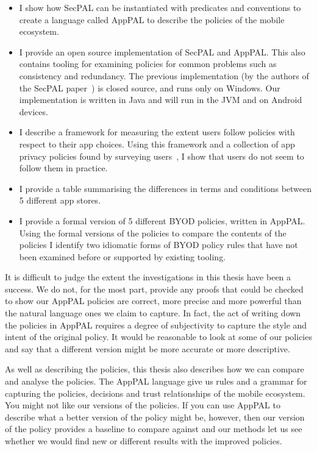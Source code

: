 \documentclass[thesis.tex]{subfiles}
\begin{document}
\begin{itemize}
  \item I show how SecPAL can be instantiated with predicates and conventions
    to create a language called AppPAL to describe the policies of the mobile
    ecosystem.
  \item I provide an open source implementation of SecPAL and AppPAL. This also
    contains tooling for examining policies for common problems such as
    consistency and redundancy.  The previous implementation (by the authors of
    the SecPAL paper~\cite{becker_secpal:_2006}) is closed source, and runs
    only on Windows.  Our implementation is written in Java and will run in the
    JVM and on Android devices.
  \item I describe a framework for measuring the extent users follow policies
    with respect to their app choices.  Using this framework and a collection
    of app privacy policies found by surveying users~\cite{lin_modeling_2014},
    I show that users do not seem to follow them in practice.
  \item I provide a table summarising the differences in terms and conditions
    between 5 different app stores.
  \item I provide a formal version of 5 different \ac{BYOD} policies, written in
    AppPAL.  Using the formal versions of the policies to compare the contents
    of the policies I identify two idiomatic forms of \ac{BYOD} policy rules that
    have not been examined before or supported by existing tooling.
\end{itemize}

It is difficult to judge the extent the investigations in this thesis have been
a success.  We do not, for the most part, provide any proofs that could be
checked to show our AppPAL policies are correct, more precise and more powerful
than the natural language ones we claim to capture.  In fact, the act of writing
down the policies in AppPAL requires a degree of subjectivity to capture the style
and intent of the original policy. It would be reasonable to look at some of
our policies and say that a different version might be more accurate or more
descriptive.

As well as describing the policies, this thesis also describes how we can
compare and analyse the policies. The AppPAL language give us rules and a
grammar for capturing the policies, decisions and trust relationships of the
mobile ecosystem.  You might not like our versions of the policies. If you can
use AppPAL to describe what a better version of the policy might be, however,
then our version of the policy provides a baseline to compare against and our
methods let us see whether we would find new or different results with the
improved policies.
\end{document}
